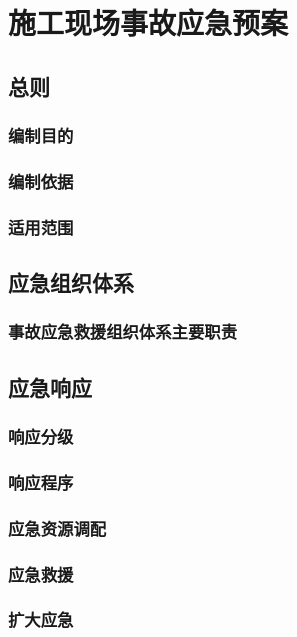 \section{施工现场事故应急预案}
\subsection{总则}
\subsubsection{编制目的}

\subsubsection{编制依据}

\subsubsection{适用范围}

\subsection{应急组织体系}
\subsubsection{事故应急救援组织体系主要职责}

\subsection{应急响应}
\subsubsection{响应分级}

\subsubsection{响应程序}

\subsubsection{应急资源调配}

\subsubsection{应急救援}

\subsubsection{扩大应急}

